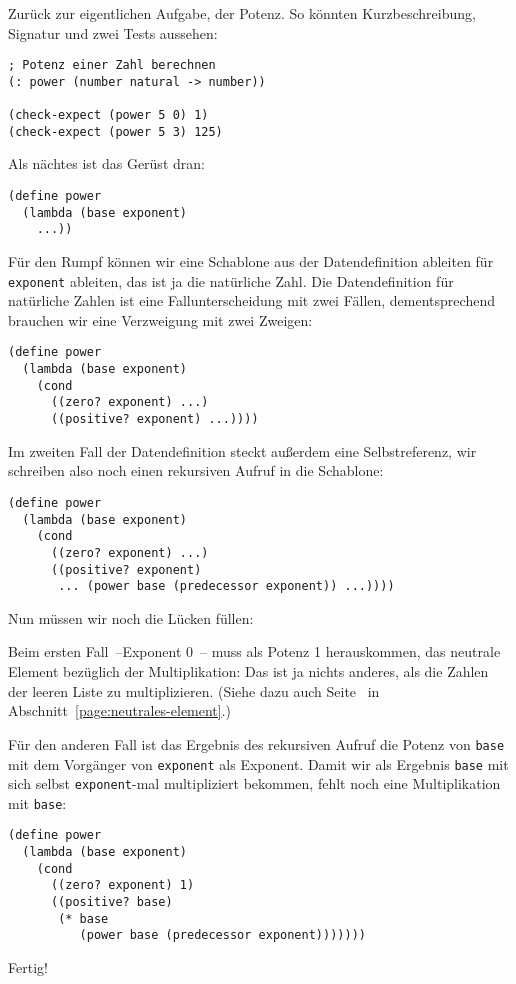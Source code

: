 Zurück zur eigentlichen Aufgabe, der Potenz.  So könnten
Kurzbeschreibung, Signatur und zwei Tests aussehen:
%
\begin{lstlisting}
; Potenz einer Zahl berechnen
(: power (number natural -> number))

(check-expect (power 5 0) 1)
(check-expect (power 5 3) 125)
\end{lstlisting}
%
Als nächtes ist das Gerüst dran:
%
\begin{lstlisting}
(define power
  (lambda (base exponent)
    ...))
\end{lstlisting}
%
Für den Rumpf können wir eine Schablone aus der Datendefinition
ableiten für \lstinline{exponent} ableiten, das ist ja die natürliche
Zahl.  Die Datendefinition für natürliche Zahlen ist eine
Fallunterscheidung mit zwei Fällen, dementsprechend brauchen wir eine
Verzweigung mit zwei Zweigen:
%
\begin{lstlisting}
(define power
  (lambda (base exponent)
    (cond
      ((zero? exponent) ...)
      ((positive? exponent) ...))))
\end{lstlisting}
%
Im zweiten Fall der Datendefinition steckt außerdem eine
Selbstreferenz, wir schreiben also noch einen rekursiven Aufruf in die
Schablone:
%
\begin{lstlisting}
(define power
  (lambda (base exponent)
    (cond
      ((zero? exponent) ...)
      ((positive? exponent)
       ... (power base (predecessor exponent)) ...))))
\end{lstlisting}
%
Nun müssen wir noch die Lücken füllen:

Beim ersten Fall~--Exponent 0~-- muss als Potenz 1 herauskommen, das
neutrale Element bezüglich der Multiplikation: Das ist ja nichts
anderes, als die Zahlen der leeren Liste zu multiplizieren.  (Siehe
dazu auch Seite~\pageref{page:neutrales-element} in
Abschnitt~\ref{page:neutrales-element}.)

Für den anderen Fall ist das Ergebnis des rekursiven Aufruf die Potenz
von \lstinline{base} mit dem Vorgänger von \lstinline{exponent} als
Exponent.  Damit wir als Ergebnis \lstinline{base} mit sich selbst
\lstinline{exponent}-mal multipliziert bekommen, fehlt noch eine
Multiplikation mit \lstinline{base}:
%
\begin{lstlisting}
(define power
  (lambda (base exponent)
    (cond
      ((zero? exponent) 1)
      ((positive? base)
       (* base
          (power base (predecessor exponent)))))))
\end{lstlisting}
%
Fertig!

